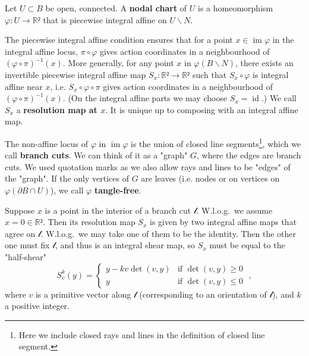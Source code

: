 \documentclass[12pt,a4paper,abstract=true,draft]{scrartcl}
\DeclareMathOperator{\id}{id}
\DeclareMathOperator{\im}{im}
\begin{document}
\begin{definition}
  Let $U ⊂ B$ be open, connected.
  A \textbf{nodal chart} of $U$ is a homeomorphism $φ \colon U → ℝ²$ that is piecewise integral affine on $U ∖ N$.
\end{definition}

The piecewise integral affine condition ensures that for a point $x ∈ \im φ$ in the integral affine locus, $π ∘ φ$ gives action coordinates in a neighbourhood of $(φ ∘ π)^{-1}(x)$.
More generally, for any point $x$ in $φ(B ∖ N)$, there exists an invertible piecewise integral affine map $S_x\colon ℝ² → ℝ²$ such that $S_x ∘ φ$ is integral affine near $x$, i.e. $S_x ∘ φ ∘ π$ gives action coordinates in a neighbourhood of $(φ ∘ π)^{-1}(x)$. (On the integral affine parts we may choose $S_x = \id$.)
We call $S_x$ a \textbf{resolution map at $x$}.
It is unique up to composing with an integral affine map.

The non-affine locus of $φ$ in $\im φ$ is the union of closed line segments\footnote{Here we include closed rays and lines in the definition of closed line segment.}, which we call \textbf{branch cuts}.
We can think of it as a "graph" $G$, where the edges are branch cuts.
We used quotation marks as we also allow rays and lines to be "edges" of the "graph".
If the only vertices of $G$ are leaves (i.e. nodes or on vertices on $φ(∂B ∩ U)$), we call $φ$ \textbf{tangle-free}.

\begin{remark}
  \label{rem:bc_resolution}
  Suppose $x$ is a point in the interior of a branch cut $𝓁$. W.l.o.g.\ we assume $x = 0 ∈ ℝ²$.
Then its resolution map $S_x$ is given by two integral affine maps that agree on $𝓁$.
W.l.o.g.\ we may take one of them to be the identity.
Then the other one must fix $𝓁$, and thus is an integral shear map, so $S_x$ must be equal to the "half-shear"
\begin{equation}
  \label{eq:half_shear}
  S_v^k(y) = \begin{cases}
    y - k v\det(v,y) & \text{if } \det(v,y) ≥ 0 \\
    y & \text{if } \det(v,y) ≤ 0
  \end{cases} \; ,
\end{equation}
where $v$ is a primitive vector along $𝓁$ (corresponding to an orientation of $𝓁$), and $k$ a positive integer.
\end{remark}
\end{document}
